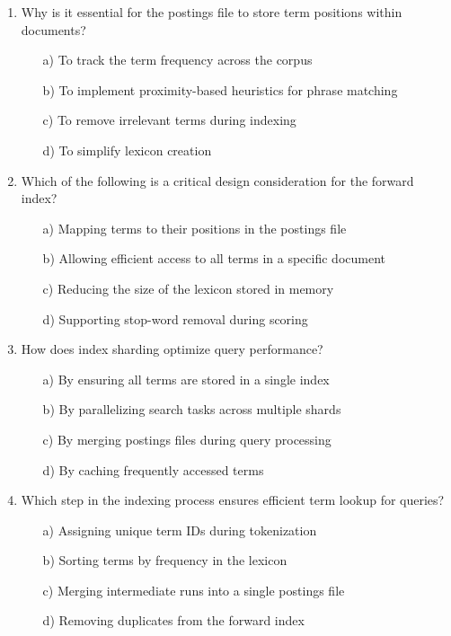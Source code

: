 \documentclass[8pt]{extarticle}
\begin{document}
\begin{multicols}{2}
\begin{enumerate}
\item Why is it essential for the postings file to store term positions within documents?
\begin{itemize}
\item[a)] To track the term frequency across the corpus
\item[b)] To implement proximity-based heuristics for phrase matching
\item[c)] To remove irrelevant terms during indexing
\item[d)] To simplify lexicon creation
\end{itemize}

\item Which of the following is a critical design consideration for the forward index?
\begin{itemize}
\item[a)] Mapping terms to their positions in the postings file
\item[b)] Allowing efficient access to all terms in a specific document
\item[c)] Reducing the size of the lexicon stored in memory
\item[d)] Supporting stop-word removal during scoring
\end{itemize}

\item How does index sharding optimize query performance?
\begin{itemize}
\item[a)] By ensuring all terms are stored in a single index
\item[b)] By parallelizing search tasks across multiple shards
\item[c)] By merging postings files during query processing
\item[d)] By caching frequently accessed terms
\end{itemize}

\item Which step in the indexing process ensures efficient term lookup for queries?
\begin{itemize}
\item[a)] Assigning unique term IDs during tokenization
\item[b)] Sorting terms by frequency in the lexicon
\item[c)] Merging intermediate runs into a single postings file
\item[d)] Removing duplicates from the forward index
\end{itemize}



\end{enumerate}
\end{multicols}
\end{document}
